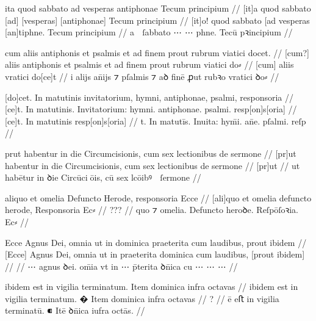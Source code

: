 \ex \bg
\gla
{}
ita quod sabbato ad vesperas antiphonae Tecum principium
//
\glRekonstrukcja
{}
[it]a quod sabbato [ad] [vesperas] [antiphonae] Tecum principium
//
\glUbytki
{}
[it]o! quod sabbato [ad vesperas [an]tiphne. Tecum principium
//
\glU
{}
a  ſabbato ⋯ ⋯ phne. Tecū pꝛincipium
//
\endgl
\xe



\ex \bg
\gla
{}
cum aliis antiphonis et psalmis et ad finem prout rubrum viatici docet. 
//
\glRekonstrukcja
{}
[cum?] aliis antiphonis et psalmis et ad finem prout rubrum viatici do⸗ 
//
\glUbytki
{}
[cum] aliis
{} {} {} {} {} {} {} {} 
vratici do[ce]t
//
\glU
{}
i alijs an̄ijs ⁊ pſalmis ⁊ aꝺ finē ꝓut rubꝛo vratici ꝺo⸗ 
//
\endgl
\xe



\ex \bg
\gla
{}
[do]cet. In matutinis invitatorium, hymni, antiphonae, psalmi, responsoria
//
\glRekonstrukcja
{}
[ce]t. In matutinis. Invitatorium: hymni. antiphonae. psalmi. resp[on]s[oria] 
//
\glUbytki
{}
[ce]t. In matutinis
{} {} {} {}
resp[on]s[oria]
//
\glU
{}
t. In matutīs. Inuita: hym̄i. an̄e. pſalmi. reſp
//
\endgl
\xe



\ex \bg
\gla
{}
prut habentur in die Circumcisionis, cum sex lectionibus de sermone
//
\glRekonstrukcja
{}
[pr]ut habentur in die Circumcisionis, cum sex lectionibus de sermone
//
\glUbytki
{}
[pr]ut
//
\glU
{}
ut habētur in ꝺie Circūciōis, cū sex lcōibꝰ  ſermone
//
\endgl
\xe

\ex \bg
\gla
{}
aliquo et
omelia Defuncto Herode, responsoria Ecce
//
\glRekonstrukcja
{}
[ali]quo et
omelia defuncto herode, Responsoria Ec⸗
//
\glUbytki
{}
???
//
\glU
{}
quo ⁊ omelia. Defuncto heroꝺe. Reſpōſoꝛia. Ec⸗
//
\endgl
\xe




\ex \bg
\gla
{}
Ecce Agnus Dei, omnia ut in dominica praeterita {} cum laudibus, prout ibidem
//
\glRekonstrukcja
{}
[Ecce] Agnus Dei, omnia ut in {} praeterita dominica cum laudibus, [prout ibidem]
//
\glUbytki
{}
//
\glU
{}
⋯ agnus ꝺei. om̄ia vt in ⋯ p̄terita ꝺn̄ica cu ⋯ ⋯ ⋯
//
\endgl
\xe



\ex \bg
\gla
{}
ibidem est in vigilia terminatum.
{} Item dominica infra octavas
//
\glRekonstrukcja
{}
ibidem est in vigilia terminatum.
� Item dominica infra octavas
//
\glUbytki
{?}
//
\glU
{}
ē eﬅ in vigilia terminatū. ⁌ Itē ꝺn̄ica iufra octās.
//
\endgl
\xe



